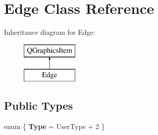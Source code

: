\hypertarget{class_edge}{}\section{Edge Class Reference}
\label{class_edge}
Inheritance diagram for Edge\+:\begin{figure}[H]
\begin{center}
\leavevmode
\includegraphics[height=2.000000cm]{class_edge}
\end{center}
\end{figure}
\subsection*{Public Types}
\begin{DoxyCompactItemize}
\item 
\mbox{\label{class_edge_a1076c24a9c10f5e019ee362060200329}} 
enum \{ {\bfseries Type} = User\+Type + 2
 \}
\end{DoxyCompactItemize}
